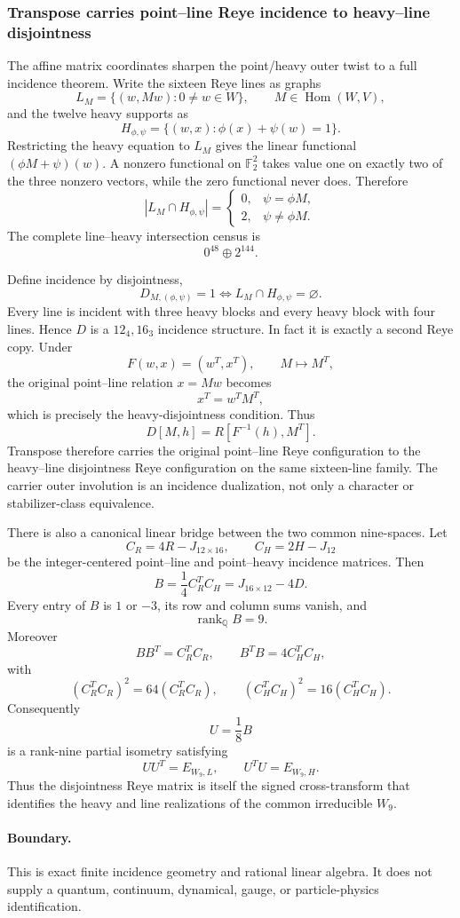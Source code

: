\subsubsection{Transpose carries point--line Reye incidence to heavy--line disjointness}
\label{sec:pass5798-5799-reye-disjointness-duality}

The affine matrix coordinates sharpen the point/heavy outer twist to a full
incidence theorem.  Write the sixteen Reye lines as graphs
\[
 L_M=\{(w,Mw):0\ne w\in W\},
 \qquad M\in\operatorname{Hom}(W,V),
\]
and the twelve heavy supports as
\[
 H_{\phi,\psi}=\{(w,x):\phi(x)+\psi(w)=1\}.
\]
Restricting the heavy equation to $L_M$ gives the linear functional
$(\phi M+\psi)(w)$.  A nonzero functional on $\mathbb F_2^2$ takes value one
on exactly two of the three nonzero vectors, while the zero functional never
does.  Therefore
\[
 \boxed{
 |L_M\cap H_{\phi,\psi}|=
 \begin{cases}
 0,&\psi=\phi M,\\
 2,&\psi\ne\phi M.
 \end{cases}}
\]
The complete line--heavy intersection census is
\[
 \boxed{0^{48}\oplus2^{144}}.
\]

Define incidence by disjointness,
\[
 D_{M,(\phi,\psi)}=1
 \iff L_M\cap H_{\phi,\psi}=\varnothing.
\]
Every line is incident with three heavy blocks and every heavy block with four
lines.  Hence $D$ is a $12_4,16_3$ incidence structure.  In fact it is exactly
a second Reye copy.  Under
\[
 F(w,x)=(w^T,x^T),
 \qquad M\mapsto M^T,
\]
the original point--line relation $x=Mw$ becomes
\[
 x^T=w^TM^T,
\]
which is precisely the heavy-disjointness condition.  Thus
\[
 \boxed{D[M,h]=R[F^{-1}(h),M^T].}
\]
Transpose therefore carries the original point--line Reye configuration to the
heavy--line disjointness Reye configuration on the same sixteen-line family.
The carrier outer involution is an incidence dualization, not only a character
or stabilizer-class equivalence.

There is also a canonical linear bridge between the two common nine-spaces.
Let
\[
 C_R=4R-J_{12\times16},
 \qquad
 C_H=2H-J_{12}
\]
be the integer-centered point--line and point--heavy incidence matrices.  Then
\[
 \boxed{
 B=\frac14 C_R^TC_H=J_{16\times12}-4D.
 }
\]
Every entry of $B$ is $1$ or $-3$, its row and column sums vanish, and
\[
 \boxed{\operatorname{rank}_{\mathbb Q}B=9}.
\]
Moreover
\[
 \boxed{BB^T=C_R^TC_R},
 \qquad
 \boxed{B^TB=4C_H^TC_H},
\]
with
\[
 (C_R^TC_R)^2=64(C_R^TC_R),
 \qquad
 (C_H^TC_H)^2=16(C_H^TC_H).
\]
Consequently
\[
 \boxed{U=\frac18B}
\]
is a rank-nine partial isometry satisfying
\[
 \boxed{
 UU^T=E_{W_9,L},
 \qquad
 U^TU=E_{W_9,H}.
 }
\]
Thus the disjointness Reye matrix is itself the signed cross-transform that
identifies the heavy and line realizations of the common irreducible $W_9$.

\paragraph{Boundary.}
This is exact finite incidence geometry and rational linear algebra.  It does
not supply a quantum, continuum, dynamical, gauge, or particle-physics
identification.
